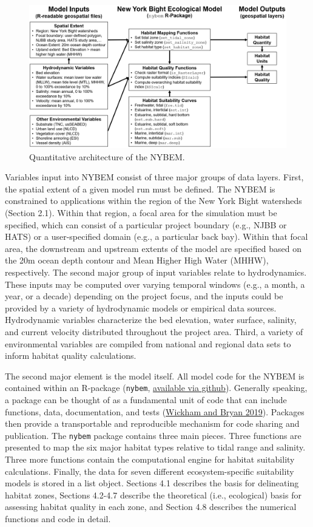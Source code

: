 \documentclass[
]{book}
\begin{document}
\begin{figure}
\includegraphics[width=25.68in]{ZZ_Fig04.01_NYBEM.Architecture} \caption{Quantitative architecture of the NYBEM.}\label{fig:unnamed-chunk-8}
\end{figure}

Variables input into NYBEM consist of three major groups of data layers. First, the spatial extent of a given model run must be defined. The NYBEM is constrained to applications within the region of the New York Bight watersheds (Section 2.1). Within that region, a focal area for the simulation must be specified, which can consist of a particular project boundary (e.g., NJBB or HATS) or a user-specified domain (e.g., a particular back bay). Within that focal area, the downstream and upstream extents of the model are specified based on the 20m ocean depth contour and Mean Higher High Water (MHHW), respectively. The second major group of input variables relate to hydrodynamics. These inputs may be computed over varying temporal windows (e.g., a month, a year, or a decade) depending on the project focus, and the inputs could be provided by a variety of hydrodynamic models or empirical data sources. Hydrodynamic variables characterize the bed elevation, water surface, salinity, and current velocity distributed throughout the project area. Third, a variety of environmental variables are compiled from national and regional data sets to inform habitat quality calculations.

The second major element is the model itself. All model code for the NYBEM is contained within an R-package (\texttt{nybem}, \href{https://github.com/MVR-GIS}{available via github}). Generally speaking, a package can be thought of as a fundamental unit of code that can include functions, data, documentation, and tests (\href{https://r-pkgs.org/}{Wickham and Bryan 2019}). Packages then provide a transportable and reproducible mechanism for code sharing and publication. The \texttt{nybem} package contains three main pieces. Three functions are presented to map the six major habitat types relative to tidal range and salinity. Three more functions contain the computational engine for habitat suitability calculations. Finally, the data for seven different ecosystem-specific suitability models is stored in a list object. Sections 4.1 describes the basis for delineating habitat zones, Sections 4.2-4.7 describe the theoretical (i.e., ecological) basis for assessing habitat quality in each zone, and Section 4.8 describes the numerical functions and code in detail.
\end{document}
